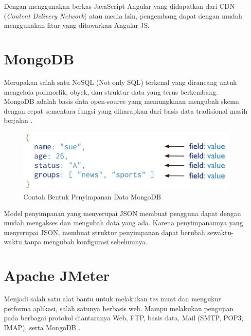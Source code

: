 \documentclass{ta-its}
\begin{document}
			Dengan menggunakan berkas JavaScript Angular yang didapatkan dari CDN (\textit{Content Delivery Network}) atau media lain, pengembang dapat dengan mudah menggunakan fitur yang ditawarkan Angular JS.
			
		\section{MongoDB}
			Merupakan salah satu NoSQL (Not only SQL) terkenal yang dirancang untuk mengelola polimorfik, obyek, dan struktur data yang terus berkembang. MongoDB adalah basis data open-source yang memungkinan mengubah skema dengan cepat sementara fungsi yang diharapkan dari basis data tradisional masih berjalan \cite{selfDescription}\cite{mongoDB}.
			
			\begin{figure}[h] %
				\centering
				\includegraphics[width=\linewidth]{contoh_img/contoh_mongodb}
				\caption{Contoh Bentuk Penyimpanan Data MongoDB}
				\label{contohMongoDB}
			\end{figure}
			
			Model penyimpanan yang menyerupai JSON membuat pengguna dapat dengan mudah mengakses dan mengubah data yang ada. Karena penyimpanannya yang menyerupai JSON, membuat struktur penyimpanan dapat berubah sewaktu-waktu tanpa mengubah konfigurasi sebelumnya.
		
		\section{Apache JMeter}
			Menjadi salah satu alat bantu untuk melakukan tes muat dan mengukur performa aplikasi, salah satunya berbasis web. Mampu melakukan pengujian pada berbagai protokol diantaranya Web, FTP, basis data, Mail (SMTP, POP3, IMAP), serta MongoDB \cite{JMeter}.
			
\end{document}
